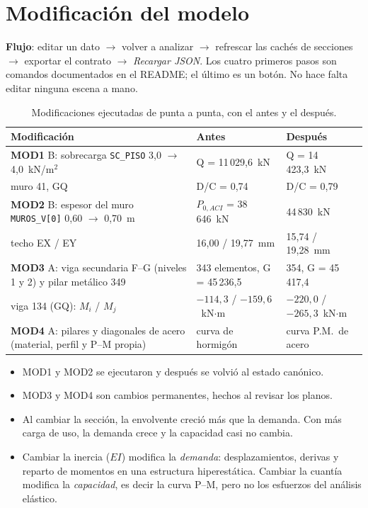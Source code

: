 \documentclass[11pt,a4paper]{article}
\begin{document}
\section{Modificación del modelo}

\textbf{Flujo}: editar un dato $\to$ volver a analizar $\to$ refrescar las
cachés de secciones $\to$ exportar el contrato $\to$ \emph{Recargar JSON}. Los
cuatro primeros pasos son comandos documentados en el README; el último es un
botón. No hace falta editar ninguna escena a mano.

\begin{table}[h]
\centering
\caption{Modificaciones ejecutadas de punta a punta, con el antes y el después.}
\begin{tabularx}{\textwidth}{Xll}
\toprule
Modificación & Antes & Después \\
\midrule
\textbf{MOD1} B: sobrecarga \texttt{SC\_PISO} 3,0 $\to$ 4,0~kN/m$^2$ & Q = 11\,029,6~kN & Q = 14\,423,3~kN \\
\quad muro 41, GQ & D/C = 0,74 & D/C = 0,79 \\
\textbf{MOD2} B: espesor del muro \texttt{MUROS\_V[0]} 0,60 $\to$ 0,70~m & $P_{0,ACI}$ = 38\,646~kN & 44\,830~kN \\
\quad techo EX / EY & 16,00 / 19,77~mm & 15,74 / 19,28~mm \\
\textbf{MOD3} A: viga secundaria F--G (niveles 1 y 2) y pilar metálico 349 & 343 elementos, G = 45\,236,5 & 354, G = 45\,417,4 \\
\quad viga 134 (GQ): $M_i$ / $M_j$ & $-114{,}3$ / $-159{,}6$~kN$\cdot$m & $-220{,}0$ / $-265{,}3$~kN$\cdot$m \\
\textbf{MOD4} A: pilares y diagonales de acero (material, perfil y P--M propia) & curva de hormigón & curva P.M.\ de acero \\
\bottomrule
\end{tabularx}
\end{table}

\begin{itemize}
  \item MOD1 y MOD2 se ejecutaron y después se volvió al estado canónico.
  \item MOD3 y MOD4 son cambios permanentes, hechos al revisar los planos.
  \item Al cambiar la sección, la envolvente creció más que la demanda. Con más
        carga de uso, la demanda crece y la capacidad casi no cambia.
  \item Cambiar la inercia ($EI$) modifica la \emph{demanda}: desplazamientos,
        derivas y reparto de momentos en una estructura hiperestática. Cambiar la
        cuantía modifica la \emph{capacidad}, es decir la curva P--M, pero no los
        esfuerzos del análisis elástico.
\end{itemize}
\end{document}
